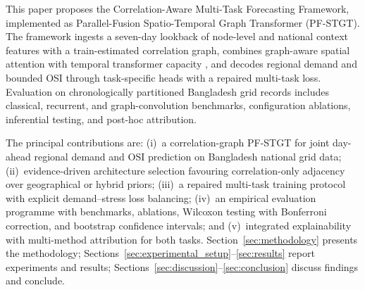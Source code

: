 This paper proposes the Correlation-Aware Multi-Task Forecasting Framework, implemented as Parallel-Fusion Spatio-Temporal Graph Transformer (PF-STGT). The framework ingests a seven-day lookback of node-level and national context features with a train-estimated correlation graph, combines graph-aware spatial attention with temporal transformer capacity \cite{Vaswani2017Attention}, and decodes regional demand and bounded OSI through task-specific heads with a repaired multi-task loss. Evaluation on chronologically partitioned Bangladesh grid records includes classical, recurrent, and graph-convolution benchmarks, configuration ablations, inferential testing, and post-hoc attribution.

The principal contributions are: (i)~a correlation-graph PF-STGT for joint day-ahead regional demand and OSI prediction on Bangladesh national grid data; (ii)~evidence-driven architecture selection favouring correlation-only adjacency over geographical or hybrid priors; (iii)~a repaired multi-task training protocol with explicit demand--stress loss balancing; (iv)~an empirical evaluation programme with benchmarks, ablations, Wilcoxon testing with Bonferroni correction, and bootstrap confidence intervals; and (v)~integrated explainability with multi-method attribution for both tasks. Section~\ref{sec:methodology} presents the methodology; Sections~\ref{sec:experimental_setup}--\ref{sec:results} report experiments and results; Sections~\ref{sec:discussion}--\ref{sec:conclusion} discuss findings and conclude.
